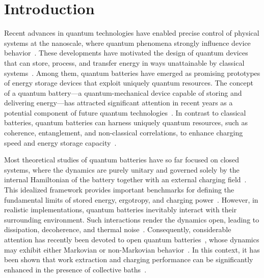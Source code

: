 \documentclass[aps,superscriptaddress,twocolumn,pre,longbibliography,floatfix]{revtex4-1}
\begin{document}
	\maketitle
	\section{Introduction}
	Recent advances in quantum technologies have enabled precise control of physical systems at the nanoscale, where quantum phenomena strongly influence device behavior~\cite{binder2018thermodynamics, Kosloff, PhysRevE.87.042123, PhysRevLett.105.130401,Alicki1979}. These developments have motivated the design of quantum devices that can store, process, and transfer energy in ways unattainable by classical systems~\cite{Alicki1979, PhysRevB.98.205423, PhysRevB.99.205437, Binder2018, Chenu2019workstatistics}. Among them, quantum batteries have emerged as promising prototypes of energy storage devices that exploit uniquely quantum resources.
	The concept of a quantum battery—a quantum-mechanical device capable of storing and delivering energy—has attracted significant attention in recent years as a potential component of future quantum technologies~\cite{QUACH20232195}. In contrast to classical batteries, quantum batteries can harness uniquely quantum resources, such as coherence, entanglement, and non-classical correlations, to enhance charging speed and energy storage capacity~\cite{PhysRevE.87.042123, RevModPhys.96.031001,PhysRevLett.120.117702, Campaioli2018, Binder_2015, PhysRevLett.129.130602, PhysRevE.102.052109, PhysRevE.97.062105, PhysRevA.106.032212, Hadipure2024,jad2026tight,jad2026suppressing}.
	
	
	Most theoretical studies of quantum batteries have so far focused on closed systems, where the dynamics are purely unitary and governed solely by the internal Hamiltonian of the battery together with an external charging field~\cite{PhysRevLett.118.150601, PhysRevB.98.205423, Binder2018}. This idealized framework provides important benchmarks for defining the fundamental limits of stored energy, ergotropy, and charging power~\cite{Kamin2020, PhysRevE.104.054117}. However, in realistic implementations, quantum batteries inevitably interact with their surrounding environment. Such interactions render the dynamics open, leading to dissipation, decoherence, and thermal noise~\cite{Harcoche, weiss2012quantum, Breuer}. Consequently, considerable attention has recently been devoted to open quantum batteries~\cite{PhysRevE.100.032107, PhysRevE.101.062114, PhysRevB.100.115142, PhysRevA.100.043833, PhysRevLett.122.210601, PhysRevResearch.2.013095, PhysRevB.99.035421, PhysRevLett.125.040601, Kamin2020}, whose dynamics may exhibit either Markovian or non-Markovian behavior~\cite{RevModPhys.88.021002, PhysRevLett.103.210401, PhysRevA.86.044101, PhysRevA.90.052118}. In this context, it has been shown that work extraction and charging performance can be significantly enhanced in the presence of collective baths~\cite{mayo2022collective,li2025collective,zhang2024quantum}.
	
\end{document}

